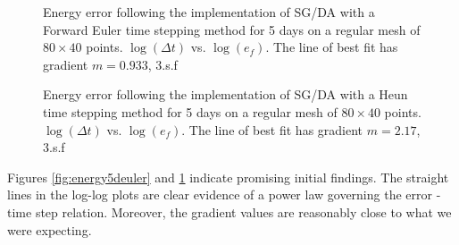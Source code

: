 \begin{figure}[ht]
	\centering
	\caption[Energy Error from implementation of SG/DA via Forward Euler timestepping method for 5 days]{Energy error following the implementation of SG/DA with a Forward Euler time stepping method for 5 days on a regular mesh of $80 \times 40$ points. $\log(\Delta t)$ vs. $\log(e_f)$. The line of best fit has gradient $m = 0.933$, 3.s.f} \label{fig:energy5deuler}
	\caption[Energy Error from implementation of SG/DA via Heun timestepping method for 5 days]{ Energy error following the implementation of SG/DA with a Heun time stepping method for 5 days on a regular mesh of $80 \times 40$ points. $\log(\Delta t)$ vs. $\log(e_f)$. The line of best fit has gradient $m = 2.17$, 3.s.f}
	\label{fig:energy5dheun}
\end{figure}
Figures \ref{fig:energy5deuler} and \ref{fig:energy5dheun} indicate promising initial findings. The straight lines in the log-log plots are clear evidence of a power law governing the error - time step relation. Moreover, the gradient values are reasonably close to what we were expecting.\\
\linebreak
